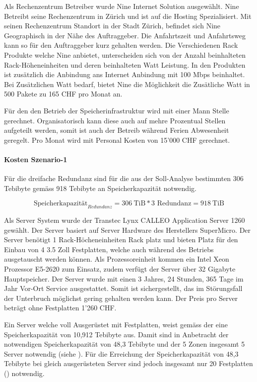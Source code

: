Als Rechenzentrum Betreiber wurde Nine Internet Solution ausgewählt. Nine Betreibt seine Rechenzentrum in Zürich und ist auf die Hosting Spezialisiert. Mit seinen Rechenzentrum Standort in der Stadt Zürich, befindet sich Nine Geographisch in der Nähe des Auftraggeber. Die Anfahrtszeit und Anfahrtsweg kann so für den Auftraggeber kurz gehalten werden. Die Verschiedenen Rack Produkte welche Nine anbietet, unterscheiden sich von der Anzahl beinhalteten Rack-Höheneinheiten und deren beinhalteten Watt Leistung. In den Produkten ist zusätzlich die Anbindung ans Internet Anbindung mit 100 Mbps beinhaltet. Bei Zusätzlichen Watt bedarf, bietet Nine die Möglichkeit die Zusätliche Watt in 500 Pakete zu 165 CHF pro Monat an.

Für den den Betrieb der Speicherinfrastruktur wird mit einer Mann Stelle gerechnet. Organisatorisch kann diese auch auf mehre Prozentual Stellen aufgeteilt werden, somit ist auch der Betreib während Ferien Abwesenheit geregelt. Pro Monat wird mit Personal Kosten von 15'000 CHF gerechnet.


\paragraph*{Kosten Szenario-1}

Für die dreifache Redundanz sind für die aus der Soll-Analyse bestimmten 306 Tebibyte gemäss  918 Tebibyte an Speicherkapazität notwendig.

\begin{equation}
\mbox{Speicherkapazität}_{Redundanz} = 306 \mathrm{\ TiB} * 3 \mbox{\ Redundanz} = 918 \mathrm{\ TiB}
\label{eqn:SpeicherkapazitätS1}
\end{equation}


Als Server System wurde der Transtec Lynx CALLEO Application Server 1260 gewählt. Der Server basiert auf Server Hardware des Herstellers SuperMicro. Der Server benötigt 1 Rack-Höcheneinheiten Rack platz und bieten Platz für den Einbau von 4 3.5 Zoll Festplatten, welche auch während des Betriebs ausgetauscht werden können. Als Prozessoreinheit kommen ein Intel Xeon Prozessor E5-2620 zum Einsatz, zudem verfügt der Server über 32 Gigabyte Hauptspeicher. Der Server wurde mit einen 3 Jahres, 24 Stunden, 365 Tage im Jahr Vor-Ort Service ausgestattet. Somit ist sichergestellt, das im Störungsfall der Unterbruch möglichst gering gehalten werden kann. Der Preis pro Server beträgt ohne Festplatten 1'260 CHF.


Ein Server welche voll Ausgerüstet mit Festplatten, weist gemäss der  eine Speicherkapazität von 10,912 Tebibyte aus. Damit sind in Anbetracht der notwendigen Speicherkapazität von 48,3 Tebibyte und der 5 Zonen insgesamt 5 Server notwendig (siehe ). Für die Erreichung der Speicherkapazität von 48,3 Tebibyte bei gleich ausgerüsteten Server sind jedoch insgesamt nur 20 Festplatten () notwendig.

